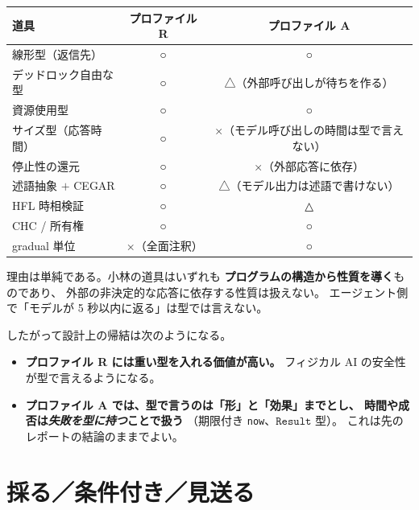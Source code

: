 \documentclass[11pt,a4paper]{ltjsarticle}
\theoremstyle{remark}
\newcommand{\ty}[1]{\ensuremath{\mathtt{#1}}}
\begin{document}
\begin{center}
\small
\begin{tabular}{@{}lcc@{}}
\toprule
道具 & プロファイル R & プロファイル A \\
\midrule
線形型（返信先） & ○ & ○ \\
デッドロック自由な型 & ○ & △（外部呼び出しが待ちを作る）\\
資源使用型 & ○ & ○ \\
サイズ型（応答時間） & ○ & ×（モデル呼び出しの時間は型で言えない）\\
停止性の還元 & ○ & ×（外部応答に依存）\\
述語抽象 $+$ CEGAR & ○ & △（モデル出力は述語で書けない）\\
HFL 時相検証 & ○ & △ \\
CHC / 所有権 & ○ & ○ \\
gradual 単位 & ×（全面注釈） & ○ \\
\bottomrule
\end{tabular}
\end{center}

理由は単純である。小林の道具はいずれも
\textbf{プログラムの構造から性質を導く}ものであり、
外部の非決定的な応答に依存する性質は扱えない。
エージェント側で「モデルが 5 秒以内に返る」は型では言えない。

したがって設計上の帰結は次のようになる。

\begin{itemize}
\item \textbf{プロファイル R には重い型を入れる価値が高い。}
  フィジカル AI の安全性が型で言えるようになる。
\item \textbf{プロファイル A では、型で言うのは「形」と「効果」までとし、
  時間や成否は\emph{失敗を型に持つ}ことで扱う}
  （期限付き \texttt{now}、\ty{Result} 型）。
  これは先のレポートの結論のままでよい。
\end{itemize}

\section{採る／条件付き／見送る}
\label{sec:not}
\end{document}
